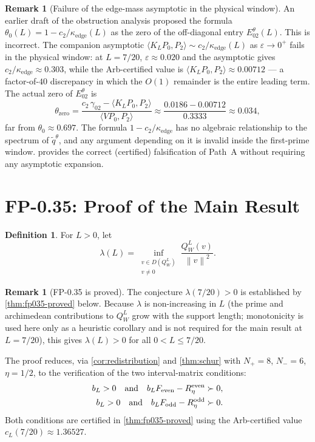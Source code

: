 \documentclass[12pt,a4paper]{amsart}
\theoremstyle{plain}
\theoremstyle{definition}
\newtheorem{definition}[theorem]{Definition}
\newtheorem{remark}[theorem]{Remark}
\newcommand{\ctwo}{c_2}              %
\newcommand{\kappae}{\kappa_{\mathrm{edge}}}
\newcommand{\norm}[1]{\left\|#1\right\|}
\begin{document}
\begin{remark}[Failure of the edge-mass asymptotic in the physical window]
\label{rem:lemma-L3-failure}
An earlier draft of the obstruction analysis proposed the formula
$\theta_0(L) = 1 - \ctwo/\kappae(L)$ as the zero of the off-diagonal entry
$E_{02}^\theta(L)$.  This is incorrect.  The companion asymptotic
$\langle K_LP_0,P_2\rangle \sim \ctwo/\kappae(L)$ as $\varepsilon \to 0^+$
fails in the physical window: at $L = 7/20$, $\varepsilon \approx 0.020$ and
the asymptotic gives $\ctwo/\kappae \approx 0.303$, while the Arb-certified
value is $\langle K_LP_0,P_2\rangle \approx 0.00712$ --- a factor-of-$40$
discrepancy in which the $O(1)$ remainder is the entire leading term.
The actual zero of $E_{02}^\theta$ is
\[
  \theta_{\mathrm{zero}}
  = \frac{\ctwo\,\gamma_{02} - \langle K_LP_0,P_2\rangle}{\langle VP_0,P_2\rangle}
  \approx \frac{0.0186 - 0.00712}{0.3333}
  \approx 0.034,
\]
far from $\theta_0 \approx 0.697$.
The formula $1 - \ctwo/\kappae$ has no algebraic relationship to the spectrum
of $\tilde{q}^\theta$, and any argument depending on it is invalid inside the
first-prime window.   provides the correct (certified)
falsification of Path~A without requiring any asymptotic expansion.
\end{remark}

\section{FP-0.35: Proof of the Main Result}
\label{sec:conjecture}

\begin{definition}
\label{def:lambda}
For $L > 0$, let
\[
  \lambda(L) = \inf_{\substack{v \in D(Q_W^L) \\ v \ne 0}}
               \frac{Q_W^L(v)}{\norm{v}^2}.
\]
\end{definition}

\begin{remark}[FP-0.35 is proved]
The conjecture $\lambda(7/20) > 0$ is established by \cref{thm:fp035-proved}
below.  Because $\lambda$ is non-increasing in $L$ (the prime and archimedean
contributions to $Q_W^L$ grow with the support length; monotonicity is used here
only as a heuristic corollary and is not required for the main result at $L=7/20$),
this gives $\lambda(L) > 0$ for all $0 < L \le 7/20$.

The proof reduces, via \cref{cor:redistribution} and
\cref{thm:schur} with $N_+ = 8$, $N_- = 6$, $\eta = 1/2$, to the
verification of the two interval-matrix conditions:
\begin{align*}
  b_L > 0 \quad\text{and}\quad b_L F_{\rm even} - R_\eta^{\rm even} &\succ 0,\\
  b_L > 0 \quad\text{and}\quad b_L F_{\rm odd}  - R_\eta^{\rm odd}  &\succ 0.
\end{align*}
Both conditions are certified in \cref{thm:fp035-proved} using the
Arb-certified value $c_L(7/20) \approx 1.36527$.
\end{remark}
\end{document}
